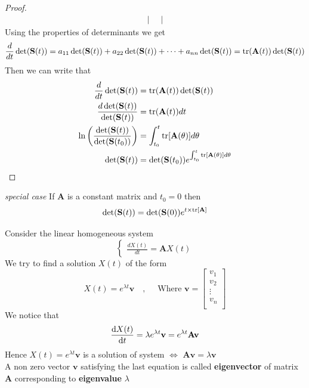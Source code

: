 \begin{proof}[\textcolor{theme}{Proof}]
\begin{align*}
\begin{vmatrix}
        \end{vmatrix}
    \end{align*}
    Using the properties of determinants we get
    \[
        \frac{d}{dt} \det(\mathbf{S}(t)) = a_{11}\det(\mathbf{S}(t)) + a_{22}\det(\mathbf{S}(t)) +\dots+a_{nn}\det(\mathbf{S}(t)) = \trace(\mathbf{A}(t))\det(\mathbf{S}(t))
    \]
    Then we can write that
    \begin{align*}
        \frac{d}{dt} \det(\mathbf{S}(t))                                     & = \trace(\mathbf{A}(t))\det(\mathbf{S}(t))
        \\
        \frac{d \det(\mathbf{S}(t))}{\det(\mathbf{S}(t))}                    & = \trace(\mathbf{A}(t)) dt
        \\
        \ln \left( \frac{\det(\mathbf{S}(t))}{\det(\mathbf{S}(t_0))} \right) & = \int_{t_0}^{t}\trace[\mathbf{A}(\theta)]d\theta
        \\
        \det(\mathbf{S}(t))                                                  & = \det(\mathbf{S}(t_0))e^{\int_{t_0}^{t}\trace[\mathbf{A}(\theta)]d\theta}
    \end{align*}
\end{proof}
\begin{enrichment*}{\textit{special case}}
    If $\mathbf{A}$ is a constant matrix and $t_0=0$ then
    \[
        \det(\mathbf{S}(t)) = \det(\mathbf{S}(0))e^{t \times \trace[\mathbf{A}]}
    \]
\end{enrichment*}
\newpage
Consider the linear homogeneous system
\begin{equation}
    \begin{cases}
        \displaystyle \frac{dX(t)}{dt} = \mathbf{A}X(t)
    \end{cases}
\end{equation}
We try to find a solution $X(t)$ of the form
\[
    X(t) = e^{\lambda t} \mathbf{v}    \quad,\quad \text{ Where }\mathbf{v} =
    \begin{bmatrix}
        v_{1}  \\
        v_{2}  \\
        \vdots \\
        v_{n}  \\
    \end{bmatrix}
\]
We notice that
$$\dv{X(t)}{t} = \lambda e^{\lambda t} \mathbf{v} = e^{\lambda t}\mathbf{A}\mathbf{v}$$
Hence $X(t)=e^{\lambda t}\mathbf{v}$ is a solution of system $\iff$ $\mathbf{A}\mathbf{v}=\lambda \mathbf{v}$\\
A non zero vector $\mathbf{v}$ satisfying the last equation is called \textbf{eigenvector} of matrix $\mathbf{A}$ corresponding to \textbf{eigenvalue} $\lambda$
